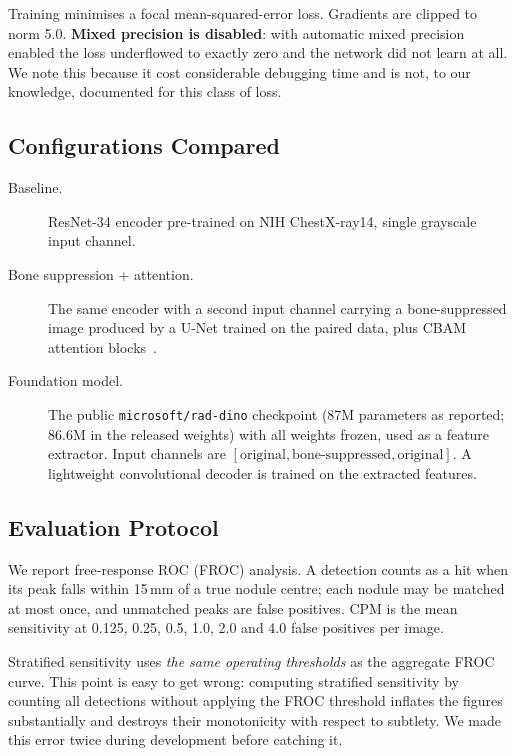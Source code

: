 \documentclass[11pt,a4paper]{article}
\begin{document}
Training minimises a focal mean-squared-error loss. Gradients are clipped to
norm 5.0. \textbf{Mixed precision is disabled}: with automatic mixed precision
enabled the loss underflowed to exactly zero and the network did not learn at
all. We note this because it cost considerable debugging time and is not, to
our knowledge, documented for this class of loss.

\subsection{Configurations Compared}
\label{sec:configs}

\begin{description}
  \item[Baseline.] ResNet-34 encoder pre-trained on NIH ChestX-ray14, single
        grayscale input channel.
  \item[Bone suppression + attention.] The same encoder with a second input
        channel carrying a bone-suppressed image produced by a U-Net trained on
        the paired data, plus CBAM attention blocks~\cite{woo2018cbam}.
  \item[Foundation model.] The public \texttt{microsoft/rad-dino} checkpoint
        (87M parameters as reported; 86.6M in the released weights) with all
        weights frozen, used as a feature extractor. Input channels are $[\text{original}, \text{bone-suppressed},
        \text{original}]$. A lightweight convolutional decoder is trained on the
        extracted features.
\end{description}

\subsection{Evaluation Protocol}

We report free-response ROC (FROC) analysis. A detection counts as a hit when
its peak falls within 15\,mm of a true nodule centre; each nodule may be matched
at most once, and unmatched peaks are false positives. CPM is the mean
sensitivity at 0.125, 0.25, 0.5, 1.0, 2.0 and 4.0 false positives per image.

Stratified sensitivity uses \emph{the same operating thresholds} as the
aggregate FROC curve. This point is easy to get wrong: computing stratified
sensitivity by counting all detections without applying the FROC threshold
inflates the figures substantially and destroys their monotonicity with respect
to subtlety. We made this error twice during development before catching it.
\end{document}
